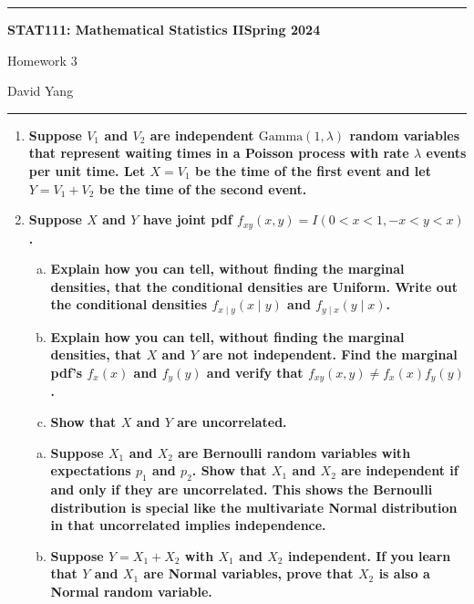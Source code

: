 \documentclass[11pt]{article}
\begin{document}
	\hrule
	\begin{center}
        \textbf{STAT111: Mathematical Statistics II}\hfill \textbf{Spring 2024}\newline

		{\Large Homework 3}

		David Yang
	\end{center}

\hrule

\vspace{1em}

\begin{enumerate}
    \item \textbf{Suppose $V_1$ and $V_2$ are independent $\mathrm{Gamma}(1, \lambda)$ random variables that represent waiting
    times in a Poisson process with rate $\lambda$ events per unit time. Let $X = V_1$ be the time of the
    first event and let $Y = V_1 + V_2$ be the time of the second event.}
  

    \item \textbf{Suppose $X$ and $Y$ have joint pdf $f_{xy}(x, y) = I(0 < x < 1, -x < y < x)$.}
    \begin{enumerate}[a)]
      \item \textbf{Explain how you can tell, without finding the marginal densities, that the conditional densities are Uniform.
      Write out the conditional densities $f_{x \mid y}(x \mid y)$ and $f_{y \mid x}(y \mid x)$.}
      \item \textbf{Explain how you can tell, without finding the marginal densities, that $X$ and $Y$ are not independent. Find the marginal pdf's $f_x(x)$ and $f_y(y)$ 
      and verify that $f_{xy}(x, y) \neq f_x(x)f_y(y)$.}
      \item \textbf{Show that $X$ and $Y$ are uncorrelated.}
    \end{enumerate}

    \begin{enumerate}[a)]
      \item \textbf{Suppose $X_1$ and $X_2$ are Bernoulli random variables with expectations $p_1$ and $p_2$. Show that $X_1$ and $X_2$ are independent if and only if they are uncorrelated.
      This shows the Bernoulli distribution is special like the multivariate Normal distribution in that uncorrelated implies independence.}
      \item \textbf{Suppose $Y = X_1 + X_2$ with $X_1$ and $X_2$ independent. If you learn that $Y$ and $X_1$ are
      Normal variables, prove that $X_2$ is also a Normal random variable.}
    \end{enumerate}
    
\end{enumerate}
\end{document}
